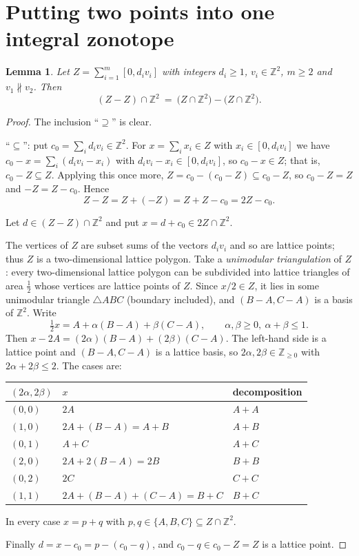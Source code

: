 \documentclass[11pt,reqno]{amsart}
\theoremstyle{plain}
\newtheorem{lem}[thm]{Lemma}
\theoremstyle{definition}
\theoremstyle{remark}
\theoremstyle{plain}
\theoremstyle{remark}
\theoremstyle{definition}
\numberwithin{equation}{section}
\newcommand{\Z}{\mathbb{Z}}
\begin{document}
\section{Putting two points into one integral zonotope}\label{sec:zonotope}

\begin{lem}\label{lem:zonotope}
Let $Z=\sum_{i=1}^m[0,d_iv_i]$ with integers $d_i\ge1$, $v_i\in\Z^2$, $m\ge2$
and $v_1\not\parallel v_2$.  Then
\begin{equation}
(Z-Z)\cap\Z^2\ =\ \bigl(Z\cap\Z^2\bigr)-\bigl(Z\cap\Z^2\bigr).
\label{eq:ZZ}
\end{equation}
\end{lem}

\begin{proof}
The inclusion ``$\supseteq$'' is clear.

``$\subseteq$'': put $c_0=\sum_id_iv_i\in\Z^2$.  For $x=\sum_ix_i\in Z$ with
$x_i\in[0,d_iv_i]$ we have $c_0-x=\sum_i(d_iv_i-x_i)$ with
$d_iv_i-x_i\in[0,d_iv_i]$, so $c_0-x\in Z$; that is, $c_0-Z\subseteq Z$.
Applying this once more, $Z=c_0-(c_0-Z)\subseteq c_0-Z$, so $c_0-Z=Z$ and
$-Z=Z-c_0$.  Hence
\[Z-Z=Z+(-Z)=Z+Z-c_0=2Z-c_0 .\]

Let $d\in(Z-Z)\cap\Z^2$ and put $x=d+c_0\in 2Z\cap\Z^2$.

The vertices of $Z$ are subset sums of the vectors $d_iv_i$ and so are lattice
points; thus $Z$ is a two-dimensional lattice polygon.  Take a \emph{unimodular
triangulation} of $Z$: every two-dimensional lattice polygon can be subdivided
into lattice triangles of area $\tfrac12$ whose vertices are lattice points of
$Z$.  Since $x/2\in Z$, it lies in some unimodular triangle $\triangle ABC$
(boundary included), and $(B-A,C-A)$ is a basis of $\Z^2$.  Write
\[\tfrac12x=A+\alpha(B-A)+\beta(C-A),\qquad \alpha,\beta\ge0,\ \alpha+\beta\le1 .\]
Then $x-2A=(2\alpha)(B-A)+(2\beta)(C-A)$.  The left-hand side is a lattice point
and $(B-A,C-A)$ is a lattice basis, so $2\alpha,2\beta\in\Z_{\ge0}$ with
$2\alpha+2\beta\le2$.  The cases are:
\begin{center}
\begin{tabular}{@{}lll@{}}
\toprule
$(2\alpha,2\beta)$ & $x$ & decomposition\\
\midrule
$(0,0)$ & $2A$                        & $A+A$\\
$(1,0)$ & $2A+(B-A)=A+B$              & $A+B$\\
$(0,1)$ & $A+C$                       & $A+C$\\
$(2,0)$ & $2A+2(B-A)=2B$              & $B+B$\\
$(0,2)$ & $2C$                        & $C+C$\\
$(1,1)$ & $2A+(B-A)+(C-A)=B+C$        & $B+C$\\
\bottomrule
\end{tabular}
\end{center}
In every case $x=p+q$ with $p,q\in\{A,B,C\}\subseteq Z\cap\Z^2$.

Finally $d=x-c_0=p-(c_0-q)$, and $c_0-q\in c_0-Z=Z$ is a lattice point.
\end{proof}
\end{document}
